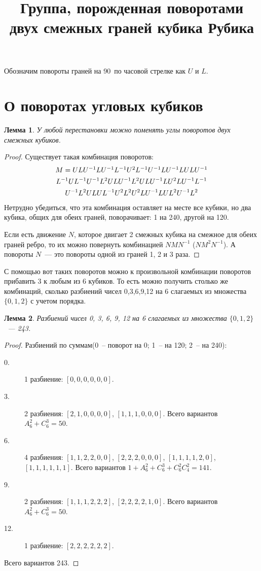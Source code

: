 \documentclass[utf8,a4paper,draft]{article}
\title{Группа, порожденная поворотами двух смежных граней кубика Рубика}
\author{}
\date{}
\newtheorem{lemma_cub}{Лемма}[section]
\begin{document}
\maketitle
Обозначим повороты граней на 90\textdegree~по часовой стрелке как $U$ и $L$.
\section{О поворотах угловых кубиков}
\begin{lemma_cub}
У любой перестановки можно поменять углы поворотов двух смежных кубиков.
\end{lemma_cub}
\begin{proof}
Существует такая комбинация поворотов:
\begin{multline*}
$$
M = ULU^{-1}LU^{-1}L^{-1}U^2L^{-1}U^{-1}LU^{-1}LULU^{-1}       \\
    L^{-1}UL^{-1}U^{-1}L^2ULU^{-1}L^2ULU^{-1}LU^2LU^{-1}L^{-1} \\
    U^{-1}L^2ULUL^{-1}U^2L^2U^2LU^{-1}LUL^2U^{-1}L^2
$$
\end{multline*}
    Нетрудно убедиться, что эта комбинация оставляет на месте все кубики, но
два кубика, общих для обеих граней, поворачивает: 1 на 240\textdegree, другой
на 120\textdegree.

    Если есть движение $N$, которое двигает 2 смежных кубика на смежное для обеих граней ребро,
то их можно повернуть комбинацией $NMN^{-1}$ ($NM^2N^{-1}$).
    А повороты $N$~--- это повороты одной из граней 1, 2 и 3 раза.
\end{proof}
С помощью вот таких поворотов можно к произвольной комбинации поворотов
прибавить 3 к любым из 6 кубиков. То есть можно получить столько же комбинаций,
сколько разбиений чисел 0,3,6,9,12 на 6 слагаемых из множества $\{0,1,2\}$ с
учетом порядка.
\begin{lemma_cub}
    Разбиений чисел 0, 3, 6, 9, 12 на 6 слагаемых из множества $\{0,1,2\}$~--- 243.
\end{lemma_cub}
\begin{proof}
    Разбиений по суммам(0~-- поворот на 0\textdegree; 1~-- на 120\textdegree; 2~-- на 240\textdegree):
    \begin{description}
    \item[0.] 1 разбиение: $[0,0,0,0,0,0]$.
    \item[3.] 2 разбиения: $[2,1,0,0,0,0]$, $[1,1,1,0,0,0]$. Всего вариантов
        $A^2_6+C^3_6=50$.
    \item[6.] 4 разбиения: $[1,1,2,2,0,0]$, $[2,2,2,0,0,0]$, $[1,1,1,1,2,0]$,
        $[1,1,1,1,1,1]$. Всего вариантов $1+A^2_6+C^3_6+C^2_6C^2_4=141$.
    \item[9.] 2 разбиения: $[1,1,1,2,2,2]$, $[2,2,2,2,1,0]$. Всего вариантов
        $A^2_6+C^3_6=50$.
    \item[12.]1 разбиение: $[2,2,2,2,2,2]$.
    \end{description}
    Всего вариантов 243.
\end{proof}
\end{document}
